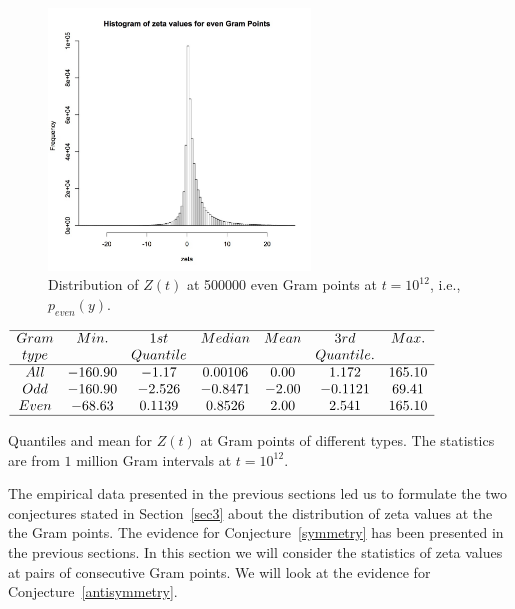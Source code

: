 \documentclass[twoside]{article}
\theoremstyle{definition}
\begin{document}
{\begin{figure}
\includegraphics[width=0.62\textwidth]{ezeta.jpg}
\caption[]{ 
   Distribution of $Z(t)$ at 500000 even Gram points  at $t = 10^{12}$, i.e., $p_{even}(y)$.
 }
\label{evenhist}
\vspace{1mm}
\end{figure}

\begin{table}
\centering \(\begin{array}{ccccccc}
\hline
 Gram &     Min.   & 1st    &  Median    &   Mean   & 3rd    &   Max. \\
 type &              & Quantile   &            &              & Quantile.    &   \\
\hline
All& -160.90 &   -1.17 &    0.00106 &   0.00  &  1.172 &165.10\\
Odd&-160.90 &   -2.526 &   -0.8471  & -2.00 &   -0.1121 &  69.41 \\
Even&-68.63 &   0.1139 &  0.8526  & 2.00 &   2.541 & 165.10 \\
\hline
\end{array}\)
\caption{Quantiles and mean for  $Z(t)$ at Gram points of different types.  The statistics are from $1$ million Gram intervals at $t=10^{12}$.} \label{tab:quantiles}
\end{table}

The empirical data presented in the  previous sections led us to formulate the two conjectures stated in Section~\ref{sec3}
about the distribution of zeta values at the the Gram points. 
The evidence for  Conjecture~\ref{symmetry} has been presented in the previous sections. 
In this section we will consider the statistics of zeta values at pairs of consecutive Gram points. We will look at the evidence for Conjecture~\ref{antisymmetry}.  

}
\end{document}
